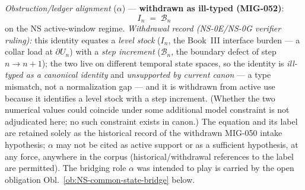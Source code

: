 \documentclass[12pt,oneside]{amsbook}
\theoremstyle{plain}
\theoremstyle{definition}
\theoremstyle{remark}
\begin{document}
\emph{Obstruction/ledger alignment} ($\alpha$) ---
\textbf{withdrawn as ill-typed (MIG-052)}:
\begin{equation}\label{hyp:NS-alpha}
 I_n \;=\; \mathcal{B}_n
\end{equation}
on the NS active-window regime. \emph{Withdrawal record
(NS-0E/NS-0G verifier ruling):} this identity equates a \emph{level
stock} ($I_n$, the Book~III interface burden --- a collar load at
$\partial U_n$) with a \emph{step increment} ($\mathcal{B}_n$, the
boundary defect of step $n \to n{+}1$); the two live on different
temporal state spaces, so the identity is \emph{ill-typed as a
canonical identity} and \emph{unsupported by current canon} --- a
type mismatch, not a normalization gap --- and it is withdrawn from
active use because it identifies a level stock with a step
increment. (Whether the two numerical values could coincide under
some additional model constraint is not adjudicated here; no such
constraint exists in canon.) The equation and its label
are retained solely as the historical record of the withdrawn
MIG-050 intake hypothesis; $\alpha$ may not be cited as active
support or as a sufficient hypothesis, at any force, anywhere in the
corpus (historical/withdrawal references to the label are
permitted). The bridging role $\alpha$ was intended to
play is carried by the open obligation
Obl.~\ref{ob:NS-common-state-bridge} below.
\end{document}
